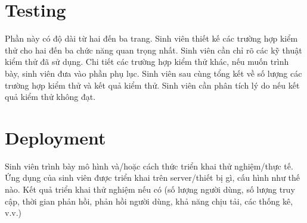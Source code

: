 \documentclass[../Main.tex]{subfiles}
\begin{document}
\section{Testing}
Phần này có độ dài từ hai đến ba trang. Sinh viên thiết kế các trường hợp kiểm thử cho hai đến ba chức năng quan trọng nhất. Sinh viên cần chỉ rõ các kỹ thuật kiểm thử đã sử dụng. Chi tiết các trường hợp kiểm thử khác, nếu muốn trình bày, sinh viên đưa vào phần phụ lục.
Sinh viên sau cùng tổng kết về số lượng các trường hợp kiểm thử và kết quả kiểm thử. Sinh viên cần phân tích lý do nếu kết quả kiểm thử không đạt.
\section{Deployment}
Sinh viên trình bày mô hình và/hoặc cách thức triển khai thử nghiệm/thực tế. Ứng dụng của sinh viên được triển khai trên server/thiết bị gì, cấu hình như thế nào. Kết quả triển khai thử nghiệm nếu có (số lượng người dùng, số lượng truy cập, thời gian phản hồi, phản hồi người dùng, khả năng chịu tải, các thống kê, v.v.)

\fi
\end{document}
